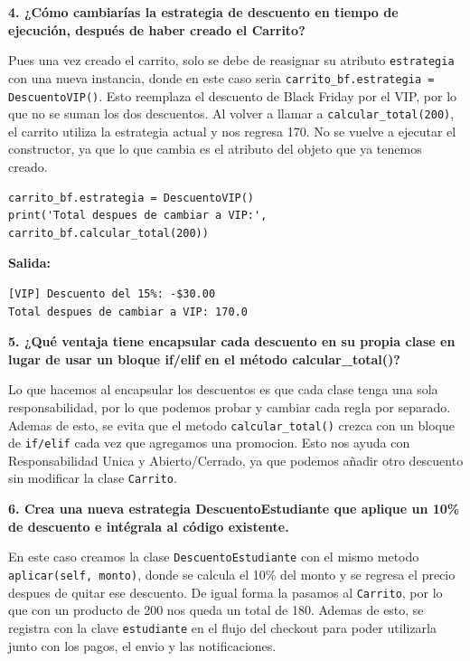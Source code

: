 \documentclass[letterpaper,11pt]{article}
\begin{document}
\textbf{4. ¿Cómo cambiarías la estrategia de descuento en tiempo de ejecución, después de haber creado el Carrito?}

Pues una vez creado el carrito, solo se debe de reasignar su atributo \texttt{estrategia} con una nueva instancia, donde en este caso seria \texttt{carrito\_bf.estrategia = DescuentoVIP()}. Esto reemplaza el descuento de Black Friday por el VIP, por lo que no se suman los dos descuentos. Al volver a llamar a \texttt{calcular\_total(200)}, el carrito utiliza la estrategia actual y nos regresa 170. No se vuelve a ejecutar el constructor, ya que lo que cambia es el atributo del objeto que ya tenemos creado.

\begin{lstlisting}[style=pythonreport]
carrito_bf.estrategia = DescuentoVIP()
print('Total despues de cambiar a VIP:', carrito_bf.calcular_total(200))
\end{lstlisting}
\par\noindent\textbf{Salida:}
\begin{lstlisting}[style=reportoutput,language={}]
[VIP] Descuento del 15%: -$30.00
Total despues de cambiar a VIP: 170.0
\end{lstlisting}

\textbf{5. ¿Qué ventaja tiene encapsular cada descuento en su propia clase en lugar de usar un bloque if/elif en el método calcular\_total()?}

Lo que hacemos al encapsular los descuentos es que cada clase tenga una sola responsabilidad, por lo que podemos probar y cambiar cada regla por separado. Ademas de esto, se evita que el metodo \texttt{calcular\_total()} crezca con un bloque de \texttt{if/elif} cada vez que agregamos una promocion. Esto nos ayuda con Responsabilidad Unica y Abierto/Cerrado, ya que podemos añadir otro descuento sin modificar la clase \texttt{Carrito}.

\textbf{6. Crea una nueva estrategia DescuentoEstudiante que aplique un 10\% de descuento e intégrala al código existente.}

En este caso creamos la clase \texttt{DescuentoEstudiante} con el mismo metodo \texttt{aplicar(self, monto)}, donde se calcula el 10\% del monto y se regresa el precio despues de quitar ese descuento. De igual forma la pasamos al \texttt{Carrito}, por lo que con un producto de 200 nos queda un total de 180. Ademas de esto, se registra con la clave \texttt{estudiante} en el flujo del checkout para poder utilizarla junto con los pagos, el envio y las notificaciones.
\end{document}
